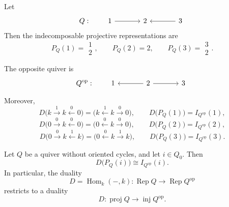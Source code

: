 \documentclass[11pt, a4paper]{report}
\begin{document}
\begin{example}
    Let
    \[
    Q:\qquad
    \begin{tikzcd}[ampersand replacement=\&, column sep=large]
    1 \arrow[r] \& 2 \& 3 \arrow[l]
    \end{tikzcd}
    \]
    Then the indecomposable projective representations are
    \[
    P_Q(1)=
    \begin{matrix}
    1\\[-2mm]
    2
    \end{matrix},
    \qquad
    P_Q(2)=2,
    \qquad
    P_Q(3)=
    \begin{matrix}
    3\\[-2mm]
    2
    \end{matrix}.
    \]

    The opposite quiver is
    \[
    Q^{\operatorname{op}}:\qquad
    \begin{tikzcd}[ampersand replacement=\&, column sep=large]
    1 \& 2 \arrow[l] \arrow[r] \& 3
    \end{tikzcd}
    \]

    Moreover,
    \[
    D\bigl(k \xrightarrow{\,1\,} k \xleftarrow{\,0\,} 0\bigr)
    =
    \bigl(k \xleftarrow{\,1\,} k \xrightarrow{\,0\,} 0\bigr),
    \qquad
    D\bigl(P_Q(1)\bigr)=I_{Q^{\operatorname{op}}}(1),
    \]
    \[
    D\bigl(0 \xrightarrow{\,0\,} k \xleftarrow{\,0\,} 0\bigr)
    =
    \bigl(0 \xleftarrow{\,0\,} k \xrightarrow{\,0\,} 0\bigr),
    \qquad
    D\bigl(P_Q(2)\bigr)=I_{Q^{\operatorname{op}}}(2),
    \]
    \[
    D\bigl(0 \xrightarrow{\,0\,} k \xleftarrow{\,1\,} k\bigr)
    =
    \bigl(0 \xleftarrow{\,0\,} k \xrightarrow{\,1\,} k\bigr),
    \qquad
    D\bigl(P_Q(3)\bigr)=I_{Q^{\operatorname{op}}}(3).
    \]
    \end{example}

    \begin{proposition}
        Let \(Q\) be a quiver without oriented cycles, and let \(i\in Q_0\). Then
        \[
        D\bigl(P_Q(i)\bigr)\cong I_{Q^{\operatorname{op}}}(i).
        \]
        In particular, the duality
        \[
        D=\operatorname{Hom}_k(-,k):\operatorname{Rep}Q\longrightarrow \operatorname{Rep}Q^{\operatorname{op}}
        \]
        restricts to a duality
        \[
        D:\operatorname{proj}Q\longrightarrow \operatorname{inj}Q^{\operatorname{op}}.
        \]
        \end{proposition}
\end{document}
